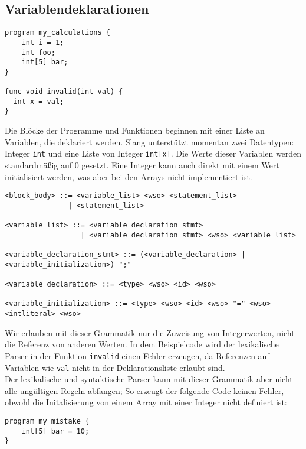 \subsection{Variablendeklarationen}

\begin{lstlisting}[caption={Slang Beispiel Variablendeklarationen}]
program my_calculations {
    int i = 1;
    int foo;
    int[5] bar;
}

func void invalid(int val) {
  int x = val;
}
\end{lstlisting}

Die Blöcke der Programme und Funktionen beginnen mit einer Liste an Variablen, die deklariert werden.
Slang unterstützt momentan zwei Datentypen: Integer \texttt{int} und eine Liste von Integer \texttt{int[x]}.
Die Werte dieser Variablen werden standardmäßig auf 0 gesetzt.
Eine Integer kann auch direkt mit einem Wert initialisiert werden, was aber bei den Arrays nicht implementiert ist.

\begin{lstlisting}[caption={Grammatikdefinition Variablendeklarationen}]
<block_body> ::= <variable_list> <wso> <statement_list>
               | <statement_list>

<variable_list> ::= <variable_declaration_stmt>
                  | <variable_declaration_stmt> <wso> <variable_list>

<variable_declaration_stmt> ::= (<variable_declaration> | <variable_initialization>) ";"

<variable_declaration> ::= <type> <wso> <id> <wso>

<variable_initialization> ::= <type> <wso> <id> <wso> "=" <wso> <intliteral> <wso>
\end{lstlisting}

Wir erlauben mit dieser Grammatik nur die Zuweisung von Integerwerten, nicht die Referenz von anderen Werten.
In dem Beispielcode wird der lexikalische Parser in der Funktion \texttt{invalid} einen Fehler erzeugen, da Referenzen auf Variablen wie \texttt{val} nicht in der Deklarationsliste erlaubt sind.\\

Der lexikalische und syntaktische Parser kann mit dieser Grammatik aber nicht alle ungültigen Regeln abfangen;
So erzeugt der folgende Code keinen Fehler, obwohl die Initalisierung von einem Array mit einer Integer nicht definiert ist:

\begin{lstlisting}[caption={Slang Beispiel: fehlerhafter Wert in der Initialisierung}]
program my_mistake {
    int[5] bar = 10;
}
\end{lstlisting}

